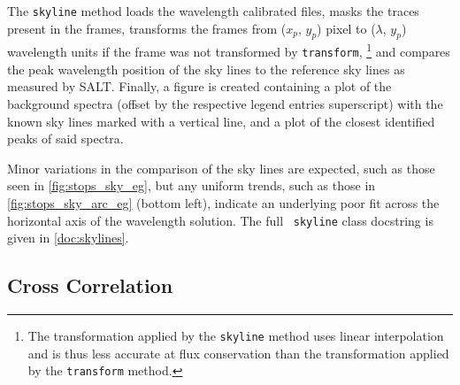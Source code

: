 The \texttt{skyline} method loads the wavelength calibrated files, masks the traces present in the frames, transforms the frames from ($x_p$, $y_p$) pixel to ($\lambda$, $y_p$) wavelength units if the frame was not transformed by \texttt{transform},%
\footnote{The transformation applied by the \texttt{skyline} method uses linear interpolation and is thus less accurate at flux conservation than the transformation applied by the \texttt{transform} method.}
and compares the peak wavelength position of the sky lines to the reference sky lines as measured by \gls{SALT}.
Finally, a figure is created containing a plot of the background spectra (offset by the respective legend entries superscript) with the known sky lines marked with a vertical line, and a plot of the closest identified peaks of said spectra.

Minor variations in the comparison of the sky lines are expected, such as those seen in \autoref{fig:stops_sky_eg}, but any uniform trends, such as those in \autoref{fig:stops_sky_arc_eg} (bottom left), indicate an underlying poor fit across the horizontal axis of the wavelength solution.
% 
The full \stops\ \texttt{skyline} class docstring is given in \autoref{doc:skylines}.

\subsection{Cross Correlation} \label{subsec:stops_correlate}

